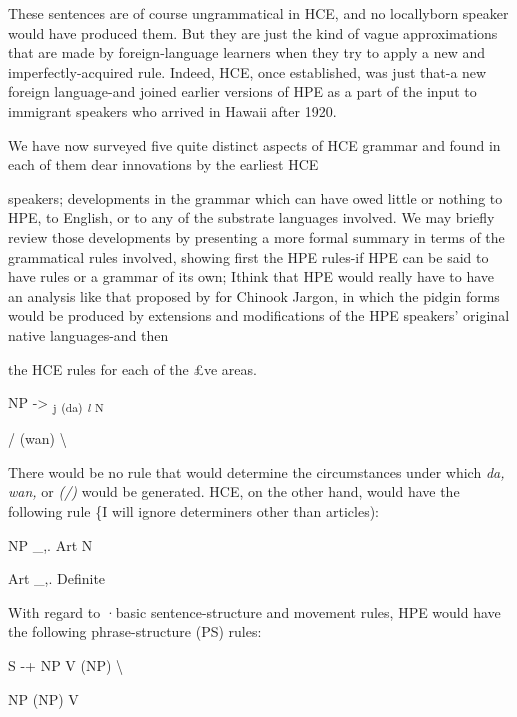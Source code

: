 These sentences are of course ungrammatical in HCE, and no locally\-born speaker would have produced them. But they are just the kind of vague approximations that are made by foreign-language learners when they try to apply a new and imperfectly-acquired rule. Indeed, HCE, once established, was just that-a new foreign language-and joined earlier versions of HPE as a part of the input to immigrant speakers who arrived in Hawaii after 1920.

We have now surveyed five quite distinct aspects of HCE gram\-mar and found in each of them dear innovations by the earliest HCE


speakers; developments in the grammar which can have owed little or nothing to HPE, to English, or to any of the substrate languages involved. We may briefly review those developments by presenting a more formal summary in terms of the grammatical rules involved, showing first the HPE rules-if HPE can be said to have rules or a grammar of its own; Ithink that HPE would really have to have an analysis like that proposed by \citet{Silverstein1972} for Chinook Jargon, in which the pidgin forms would be produced by extensions and modifications of the HPE speakers' original native languages-and then

the HCE rules for each of the £ve areas.


\ea\label{ex:91}
 NP {}-{\textgreater} \textsubscript{j}\textsubscript{ }\textsubscript{(da) }\textit{\textsubscript{l}}\textsubscript{ }\textsubscript{N}
\glt
\z

/ (wan) {\textbackslash}

There would be no rule that would determine the circumstances under which \textit{da,} \textit{wan,} or \textit{(/)} would be generated. HCE, on the other hand, would have the following rule \{I will ignore determiners other than articles): 

\ea\label{ex:92}
 NP \_,. Art N
\glt
\z

\ea\label{ex:93}
 Art \_,. Definite
\glt
\z

With regard to ·basic sentence-structure and movement rules, HPE would have the following phrase-structure (PS) rules: 

\ea\label{ex:86}
 S {}-+ NP V (NP) {\textbackslash}
\glt
\z

NP (NP) V

\ea\label{ex:94}

\glt
\z

